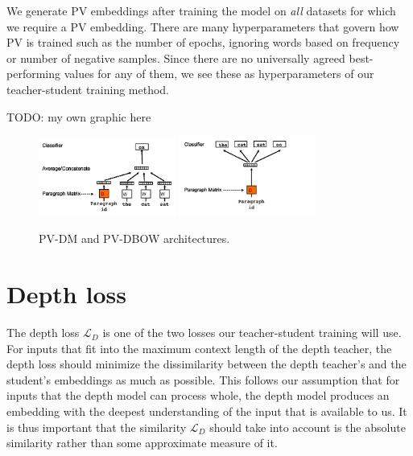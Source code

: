 We generate PV embeddings after training the model on \emph{all} datasets for
which we require a PV embedding. There are many hyperparameters that govern how
PV is trained such as the number of epochs, ignoring words based on frequency or
number of negative samples. Since there are no universally agreed
best-performing values for any of them, we see these as hyperparameters of our
teacher-student training method.

TODO: my own graphic here

\begin{figure}[h]
    \centering
    \includegraphics[width=0.4\textwidth]{./img/pv-dm.png}
    \includegraphics[width=0.4\textwidth]{./img/pv-dbow.png}
    \caption{PV-DM and PV-DBOW architectures.\label{fig:pv-dm_pv-dbow}}
\end{figure}

\section{Depth loss}


The depth loss $\mathcal{L}_D$ is one of the two losses our teacher-student
training will use. For inputs that fit into the maximum context length of the
depth teacher, the depth loss should minimize the dissimilarity between the
depth teacher's and the student's embeddings as much as possible. This follows
our assumption that for inputs that the depth model can process whole, the depth
model produces an embedding with the deepest understanding of the input that is
available to us. It is thus important that the similarity $\mathcal{L}_D$ should
take into account is the absolute similarity rather than some approximate
measure of it.

